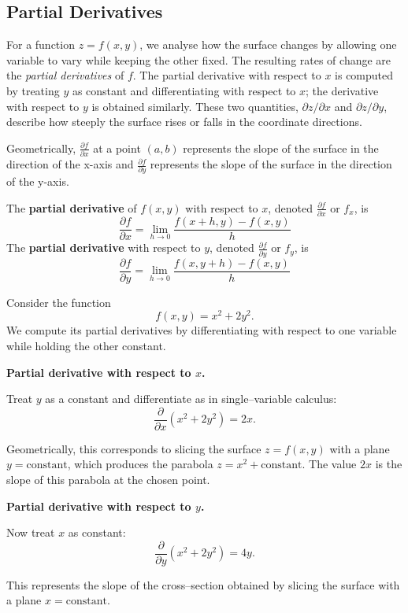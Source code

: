 \subsection*{Partial Derivatives}

For a function \(z = f(x,y)\), we analyse how the surface changes by allowing one variable to vary while keeping the other fixed. The resulting rates of change are the \emph{partial derivatives} of \(f\). The partial derivative with respect to \(x\) is computed by treating \(y\) as constant and differentiating with respect to \(x\); the derivative with respect to \(y\) is obtained similarly. These two quantities, \(\partial z/\partial x\) and \(\partial z/\partial y\), describe how steeply the surface rises or falls in the coordinate directions.

Geometrically, \( \frac{\partial f}{\partial x} \) at a point \((a, b)\) represents the slope of the surface in the direction of the x-axis and \( \frac{\partial f}{\partial y} \) represents the slope of the surface in the direction of the y-axis.


\begin{definition}
The \textbf{partial derivative} of \( f(x, y) \) with respect to \( x \), denoted \( \frac{\partial f}{\partial x} \) or \( f_x \), is
$$
\frac{\partial f}{\partial x} = \lim_{h \to 0} \frac{f(x+h, y) - f(x, y)}{h}
$$
The \textbf{partial derivative} with respect to \( y \), denoted \( \frac{\partial f}{\partial y} \) or \( f_y \), is
$$
\frac{\partial f}{\partial y} = \lim_{h \to 0} \frac{f(x, y+h) - f(x, y)}{h}
$$
\end{definition}

\begin{example}
    Consider the function 
    \[
        f(x,y) = x^{2} + 2y^{2}.
    \]
    We compute its partial derivatives by differentiating with respect to one variable while holding the other constant.

    \textbf{Partial derivative with respect to \(x\).}

    Treat \(y\) as a constant and differentiate as in single–variable calculus:
    \[
        \frac{\partial}{\partial x}(x^{2} + 2y^{2}) 
        = 2x.
    \]

    Geometrically, this corresponds to slicing the surface \(z=f(x,y)\) with a plane \(y=\text{constant}\), which produces the parabola \(z=x^{2}+\text{constant}\). The value \(2x\) is the slope of this parabola at the chosen point.

    \textbf{Partial derivative with respect to \(y\).} 

    Now treat \(x\) as constant:
    \[
        \frac{\partial}{\partial y}(x^{2} + 2y^{2})
        = 4y.
    \]

    This represents the slope of the cross–section obtained by slicing the surface with a plane \(x=\text{constant}\).

\end{example}


